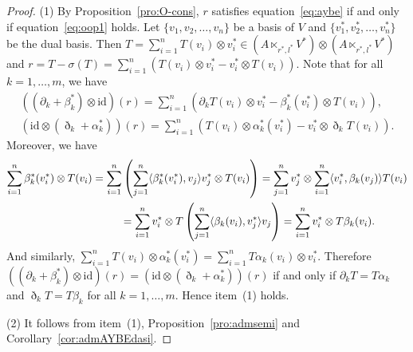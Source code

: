 \documentclass[pdftex]{sigma}
\numberwithin{equation}{section}
\newcommand{\id}{\mathrm{id}}
\begin{document}
\begin{proof}
 (1)
 By Proposition~\ref{pro:O-cons}, $r$ satisfies equation~\eqref{eq:aybe} if and only if equation~\eqref{eq:oop1} holds.
 Let $\{v_1, v_2, \dots, v_n\}$ be a basis of $V$ and $\{v_1^*, v_2^*, \dots, v_n^*\}$ be the dual basis.
 Then $T = \sum_{i=1}^n T(v_i) \otimes v_i^* \in (A \ltimes_{r^*, l^*} V^*) \otimes(A \ltimes_{r^*, l^*} V^*)$ and
 $r = T - \sigma(T) = \sum_{i=1}^n (T(v_i) \otimes v_i^* - v_i^* \otimes T(v_i))$.
 Note that for all $k=1, \dots, m$, we have
 \begin{gather*}
 ((\partial_k + \beta_k^*) \otimes \id)(r) = \sum_{i=1}^n (\partial_k T(v_i) \otimes v_i^* - \beta_k^*(v_i^*) \otimes T(v_i)),\\
 (\id \otimes(\eth_k + \alpha_k^*))(r) = \sum_{i=1}^n (T(v_i)\otimes \alpha_k^*(v_i^*) - v_i^* \otimes \eth_k T(v_i)).
 \end{gather*}
 Moreover, we have
 \begin{gather*}
 \sum_{i=1}^n \beta_k^*(v_i^*) \otimes T(v_i) = \sum_{i=1}^n\left(\sum_{j=1}^n \langle \beta_k^*(v_i^*), v_j \rangle v_j^* \otimes T(v_i)\right) = \sum_{j=1}^n v_j^* \otimes \sum_{i=1}^n
 \langle v_i^*, \beta_k(v_j) \rangle T(v_i) \\
 \hphantom{\sum_{i=1}^n \beta_k^*(v_i^*) \otimes T(v_i}{}
 =\sum_{i=1}^n v_i^* \otimes T\left(\sum_{j=1}^n \langle \beta_k(v_i), v_j^* \rangle v_j\right) = \sum_{i=1}^n v_i^* \otimes T \beta_k(v_i).
 \end{gather*}
 And similarly, $\sum_{i=1}^n T(v_i) \otimes \alpha_k^*(v_i^*) = \sum_{i=1}^n T \alpha_k(v_i)\otimes v_i^*$.
 Therefore $((\partial_k + \beta_k^*)\otimes \id)(r) = (\id \otimes (\eth_k + \alpha_k^*))(r)$ if and only if
 $\partial_k T = T \alpha_k$ and $\eth_k T = T \beta_k$ for all $k=1, \dots, m$.
 Hence item~(1) holds.

(2) It follows from item~(1), Proposition~\ref{pro:admsemi} and Corollary~\ref{cor:admAYBEdasi}.
\end{proof}
\end{document}
